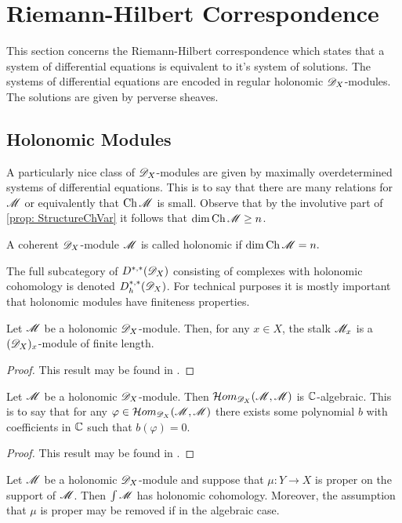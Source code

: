 \section{Riemann-Hilbert Correspondence}
This section concerns the Riemann-Hilbert correspondence which states that a system of differential equations is equivalent to it's system of solutions.
The systems of differential equations are encoded in regular holonomic $\mathscr{D}_X$-modules.
The solutions are given by perverse sheaves.
\subsection{Holonomic Modules}
A particularly nice class of $\mathscr{D}_X$-modules are given by maximally overdetermined systems of differential equations.
This is to say that there are many relations for $\mathscr{M}$ or equivalently that $\operatorname{Ch}\mathscr{M}$ is small.
Observe that by the involutive part of \cref{prop: StructureChVar} it follows that $\dim \operatorname{Ch}\mathscr{M} \geq n$.
\begin{definition}
  A coherent $\mathscr{D}_X$-module $\mathscr{M}$ is called holonomic if
  $\dim \operatorname{Ch} \mathscr{M}  = n.$
\end{definition}
The full subcategory of $D^{*,*}(\mathscr{D}_X)$ consisting of complexes with holonomic cohomology is denoted $D_h^{*,*}(\mathscr{D}_X)$.
For technical purposes it is mostly important that holonomic modules have finiteness properties.
\begin{proposition}
  Let $\mathscr{M}$ be a holonomic $\mathscr{D}_X$-module. Then, for any $x\in X$, the stalk $\mathscr{M}_x$ is a $(\mathscr{D}_X)_x$-module of finite length.
\end{proposition}
\begin{proof}
  This result may be found in \cite[Chapter 4]{kashiwara2003d}.
\end{proof}
\begin{proposition}
  Let $\mathscr{M}$ be a holonomic $\mathscr{D}_X$-module. Then $\mathcal{H}om_{\mathscr{D}_X}(\mathscr{M},\mathscr{M})$ is $\mathbb{C}$-algebraic. This is to say that for any $\varphi \in\mathcal{H}om_{\mathscr{D}_X}(\mathscr{M},\mathscr{M}) $ there exists some polynomial $b$ with coefficients in $\mathbb{C}$ such that $b(\varphi)=0$.
\end{proposition}
\begin{proof}
  This result may be found in \cite[Chapter 5]{bjork1979rings}.
\end{proof}
\begin{proposition}
  Let $\mathscr{M}$ be a holonomic $\mathscr{D}_X$-module and suppose that $\mu:Y\to X$ is proper on the support of $\mathscr{M}$. Then $\int \mathscr{M}$ has holonomic cohomology. Moreover, the assumption that $\mu$ is proper may be removed if in the algebraic case.
\end{proposition}
